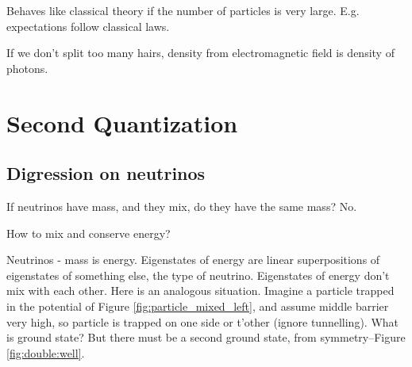 \documentclass[]{article}
\begin{document}
Behaves like classical theory if the number of particles is very large. E.g. expectations follow classical laws.

If we don't split too many hairs, density from electromagnetic field is density of photons.

\section {Second Quantization}

\subsection{Digression on neutrinos}

If neutrinos have mass, and they mix, do they have the same mass? No.

How to mix and conserve energy?

Neutrinos - mass is energy. Eigenstates of energy are linear superpositions of eigenstates of something else, the type of neutrino. Eigenstates of energy don't mix with each other. Here is an analogous situation. Imagine a particle trapped in the potential of Figure \ref{fig:particle_mixed_left}, and assume middle barrier very high, so particle is trapped on one side or t'other (ignore tunnelling). What is ground state? But there must be a second ground state, from symmetry--Figure \ref{fig:double:well}.
\end{document}
